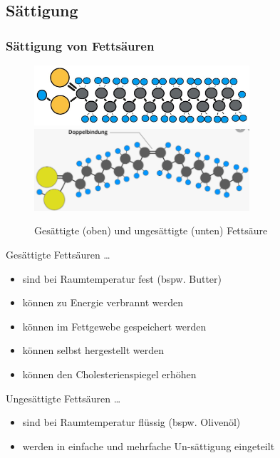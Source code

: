 \documentclass[xcolor=dvipsnames]{beamer}
\begin{document}
    \subsection{Sättigung}
    \begin{frame}[allowframebreaks]
        \frametitle{Sättigung von Fettsäuren}

        \begin{figure}
            \centering
            \includegraphics[width=8cm]{../images/fs_3.jpeg}
            \includegraphics[width=8cm]{../images/fs_4.png}
            \caption{Gesättigte (oben) und ungesättigte (unten) Fettsäure}
        \end{figure}

        \framebreak

        \begin{block}{Gesättigte Fettsäuren \ldots}
            \begin{itemize}
                \setlength\itemsep{1em}
                \item sind bei Raumtemperatur fest (bspw. Butter)
                \item können zu Energie verbrannt werden
                \item können im Fettgewebe gespeichert werden
                \item können selbst hergestellt werden
                \item können den Cholesterienspiegel erhöhen
            \end{itemize}
        \end{block}

        \framebreak

        \begin{block}{Ungesättigte Fettsäuren \ldots}
            \begin{itemize}
                \setlength\itemsep{1em}
                \item sind bei Raumtemperatur flüssig (bspw. Olivenöl)
                \item werden in einfache und mehrfache Un-sättigung eingeteilt
            \end{itemize}
        \end{block}


\end{frame}
\end{document}
